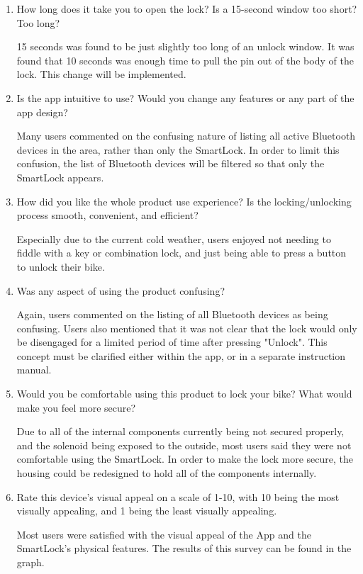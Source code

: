 \documentclass[12pt, titlepage]{article}
\begin{document}
\begin{enumerate}
    \item How long does it take you to open the lock? Is a 15-second window too short? Too long?

    15 seconds was found to be just slightly too long of an unlock window. It was found that 10 seconds was enough time to pull the pin out of the body of the lock. This change will be implemented. 
    
    \item Is the app intuitive to use? Would you change any features or any part of the app design?

    Many users commented on the confusing nature of listing all active Bluetooth devices in the area, rather than only the SmartLock. In order to limit this confusion, the list of Bluetooth devices will be filtered so that only the SmartLock appears.
    
    \item How did you like the whole product use experience? Is the locking/unlocking process smooth, convenient, and efficient?

    Especially due to the current cold weather, users enjoyed not needing to fiddle with a key or combination lock, and just being able to press a button to unlock their bike. 
    
    \item Was any aspect of using the product confusing?

    Again, users commented on the listing of all Bluetooth devices as being confusing. Users also mentioned that it was not clear that the lock would only be disengaged for a limited period of time after pressing "Unlock". This concept must be clarified either within the app, or in a separate instruction manual.
    
    \item Would you be comfortable using this product to lock your bike? What would make you feel more secure?

    Due to all of the internal components currently being not secured properly, and the solenoid being exposed to the outside, most users said they were not comfortable using the SmartLock. In order to make the lock more secure, the housing could be redesigned to hold all of the components internally. 
    
    \item Rate this device's visual appeal on a scale of 1-10, with 10 being the most visually appealing, and 1 being the least visually appealing.
    
    Most users were satisfied with the visual appeal of the App and the SmartLock's physical features. The results of this survey can be found in the  graph.
    
\end{enumerate}
\end{document}
